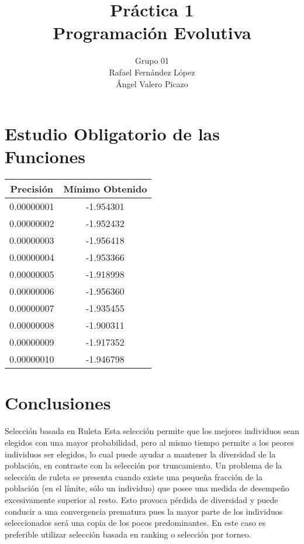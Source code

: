 \documentclass[12pt]{article}
\title{Práctica 1\\Programación Evolutiva}
\author{Grupo 01\\Rafael Fernández López\\Ángel Valero Picazo}
\date{}
\begin{document}
\maketitle
\newpage
\newpage
\tableofcontents
\newpage

\section{Estudio Obligatorio de las Funciones}	

\begin{table}[H]
\begin{center}
\begin{tabular}{|cc|} \hline
Precisión & Mínimo Obtenido \\  \hline
0.00000001 & -1.954301 \\ 
0.00000002 & -1.952432 \\ 
0.00000003 & -1.956418 \\
0.00000004 & -1.953366 \\
0.00000005 & -1.918998 \\
0.00000006 & -1.956360 \\
0.00000007 & -1.935455 \\
0.00000008 & -1.900311 \\ 
0.00000009 & -1.917352 \\
0.00000010 & -1.946798 \\  \hline
\end{tabular}
\end{center}
\end{table}
	

\section{Conclusiones}
Selección basada en Ruleta
Esta selección permite que los mejores individuos sean elegidos con una mayor probabilidad, pero al mismo tiempo permite a los peores individuos ser elegidos, lo cual puede ayudar a mantener la diversidad de la población, en contraste con la selección por truncamiento.
Un problema de la selección de ruleta se presenta cuando existe una pequeña fracción de la población (en el límite, sólo un individuo) que posee una medida de desempeño excesivamente superior al resto. Esto provoca pérdida de diversidad y puede conducir a una convergencia prematura pues la mayor parte de los individuos seleccionados será una copia de los pocos predominantes. En este caso es preferible utilizar selección basada en ranking o selección por torneo.
\end{document}
